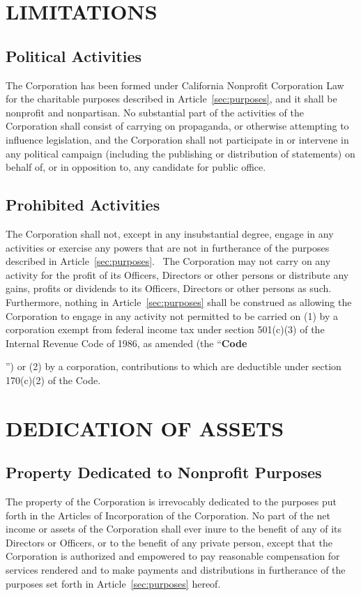 \documentclass[letterpaper,titlepage]{article}
\newcommand{\defn}[1]{\refstepcounter{defn}\textbf{#1}\addcontentsline{defn}{defn}{\protect\numberline{\thedefn}#1}}
\begin{document}
\section{LIMITATIONS}
\label{sec:limitations}
\subsection{Political Activities}
\label{sec:politicalActivities}
The Corporation has been formed under California Nonprofit Corporation Law for
the charitable purposes described in Article~\ref{sec:purposes}, and it shall be nonprofit and nonpartisan. No substantial part of the activities of the Corporation shall consist of carrying on propaganda, or otherwise attempting to influence legislation, and the Corporation shall not participate in or intervene in any political campaign (including the publishing or distribution of statements) on behalf of, or in opposition to, any candidate for public office.
\subsection{Prohibited Activities}
\label{sec:prohibitedActivities}
The Corporation shall not, except in any insubstantial degree, engage in any
activities or exercise any powers that are not in furtherance of the purposes
described in Article~\ref{sec:purposes}.  The Corporation may not carry on any
activity for the profit of its Officers, Directors or other persons or
distribute any gains, profits or dividends to its Officers, Directors or other
persons as such.  Furthermore, nothing in Article~\ref{sec:purposes} shall be
construed as allowing the Corporation to engage in any activity not permitted
to be carried on (1) by a corporation exempt from federal income tax under
section 501(c)(3) of the Internal Revenue Code of 1986, as amended (the
``\defn{Code}'') or (2) by a corporation, contributions to which are deductible under section 170(c)(2) of the Code.
\section{DEDICATION OF ASSETS}
\label{sec:dedicationAssets}
\subsection{Property Dedicated to Nonprofit Purposes}
\label{sec:propertyDedicated}
The property of the Corporation is irrevocably dedicated to the purposes put
forth in the Articles of Incorporation of the Corporation. No part of the net
income or assets of the Corporation shall ever inure to the benefit of any of
its Directors or Officers, or to the benefit of any private person, except that
the Corporation is authorized and empowered to pay reasonable compensation for
services rendered and to make payments and distributions in furtherance of the
purposes set forth in Article~\ref{sec:purposes} hereof.
\end{document}
